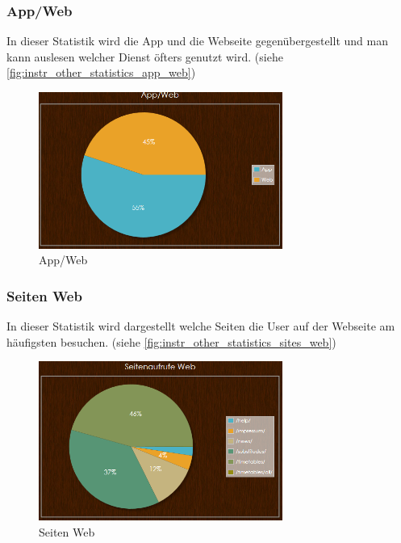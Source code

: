 \subsubsection{App/Web}
In dieser Statistik wird die App und die Webseite gegenübergestellt und man kann auslesen welcher Dienst öfters genutzt wird. (siehe \autoref{fig:instr_other_statistics_app_web})
\begin{figure}[H]
\centering
\includegraphics[keepaspectratio=true, width=8cm]{images/screenshots/statistics_app_web.png}
\caption{App/Web}
\label{fig:instr_other_statistics_app_web}
\end{figure}
\subsubsection{Seiten Web}
In dieser Statistik wird dargestellt welche Seiten die User auf der Webseite am häufigsten besuchen. (siehe \autoref{fig:instr_other_statistics_sites_web})
\begin{figure}[H]
\centering
\includegraphics[keepaspectratio=true, width=8cm]{images/screenshots/statistics_sites_web.png}
\caption{Seiten Web}
\label{fig:instr_other_statistics_sites_web}
\end{figure}
